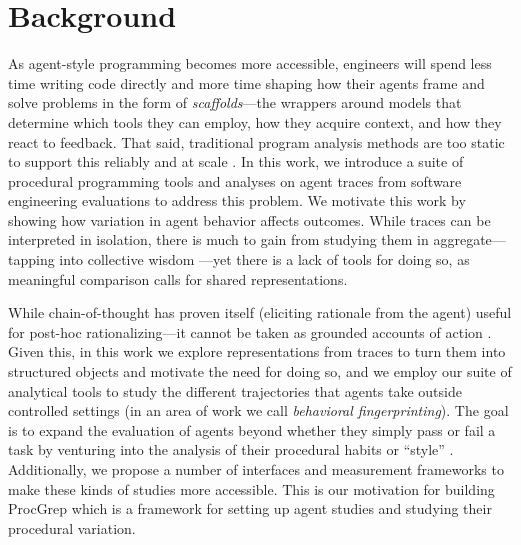 \documentclass[11pt]{article}
\begin{document}
  \section{Background}
  As agent-style programming becomes more accessible, engineers will spend less time writing code directly and more time
  shaping how their agents frame and solve problems in the form of \emph{scaffolds}---the wrappers around models that
  determine which tools they can employ, how they acquire context, and how they react to feedback. That said, traditional
  program analysis methods are too static to support this reliably and at scale
  \citep{jimenez2024swebenchlanguagemodelsresolve, yang2024sweagentagentcomputerinterfacesenable,
  chen2021evaluatinglargelanguagemodels, austin2021programsynthesislargelanguage}. In this work, we introduce a suite of
  procedural programming tools and analyses on agent traces from software engineering evaluations to address this problem.
  We motivate this work by showing how variation in agent behavior affects outcomes. While traces can be interpreted in
  isolation, there is much to gain from studying them in aggregate---tapping into collective wisdom
  \citep{surowiecki2004wisdom, Alizadeh_2015}---yet there is a lack of tools for doing so, as meaningful comparison calls
  for shared representations.

  While chain-of-thought has proven itself (eliciting rationale from the agent) useful for post-hoc rationalizing---it
  cannot be taken as grounded accounts of action \citep{wei2023chainofthoughtpromptingelicitsreasoning,
  ross2025modelingstudentlearning38, guan2025monitoringmonitorability}. Given this, in this work we explore representations
  from traces to turn them into structured objects and motivate the need for doing so, and we employ our suite of
  analytical tools to study the different trajectories that agents take outside controlled settings (in an area of work we
  call \emph{behavioral fingerprinting}). The goal is to expand the evaluation of agents beyond whether they simply pass or
  fail a task by venturing into the analysis of their procedural habits or ``style'' \citep{bisztray2025iknowllmwrote}.
  Additionally, we propose a number of interfaces and measurement frameworks to make these kinds of studies more
  accessible. This is our motivation for building ProcGrep which is a framework for setting up agent studies and studying
  their procedural variation.
\end{document}
